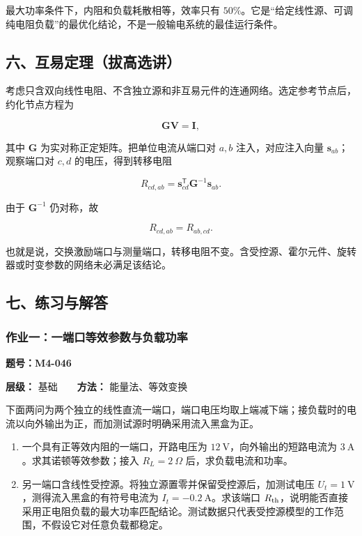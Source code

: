 最大功率条件下，内阻和负载耗散相等，效率只有
\(50\%\)。它是``给定线性源、可调纯电阻负载''的最优化结论，不是一般输电系统的最佳运行条件。

\subsection{六、互易定理（拔高选讲）}\label{m4:ux516dux4e92ux6613ux5b9aux7406ux62d4ux9ad8ux9009ux8bb2}

考虑只含双向线性电阻、不含独立源和非互易元件的连通网络。选定参考节点后，约化节点方程为

\[
\boldsymbol G\boldsymbol V=\boldsymbol I,
\]

其中 \(\boldsymbol G\) 为实对称正定矩阵。把单位电流从端口对 \(a,b\)
注入，对应注入向量 \(\boldsymbol s_{ab}\)；观察端口对 \(c,d\)
的电压，得到转移电阻

\[
R_{cd,ab}
=\boldsymbol s_{cd}^{\mathsf T}
\boldsymbol G^{-1}\boldsymbol s_{ab}.
\]

由于 \(\boldsymbol G^{-1}\) 仍对称，故

\[
\boxed{R_{cd,ab}=R_{ab,cd}}.
\]

也就是说，交换激励端口与测量端口，转移电阻不变。含受控源、霍尔元件、旋转器或时变参数的网络未必满足该结论。

\subsection{七、练习与解答}\label{m4:ux4e03ux7ec3ux4e60ux4e0eux89e3ux7b54-2}

\par{}
\noindent\begin{minipage}{\linewidth}

\subsubsection{作业一：一端口等效参数与负载功率}\label{m4:ux4f5cux4e1aux4e00ux4e00ux7aefux53e3ux7b49ux6548ux53c2ux6570ux4e0eux8d1fux8f7dux529fux7387}

\textbf{题号：M4-046}

\textbf{层级：} 基础　　\textbf{方法：} 能量法、等效变换

下面两问为两个独立的线性直流一端口，端口电压均取上端减下端；接负载时的电流以向外输出为正，而加测试源时明确采用流入黑盒为正。

\begin{enumerate}
\def\labelenumi{(\arabic{enumi})}
\item
  一个具有正等效内阻的一端口，开路电压为
  \(12\ \mathrm V\)，向外输出的短路电流为
  \(3\ \mathrm A\)。求其诺顿等效参数；接入 \(R_L=2\ \Omega\)
  后，求负载电流和功率。
\item
  另一端口含线性受控源。将独立源置零并保留受控源后，加测试电压
  \(U_t=1\ \mathrm V\)，测得流入黑盒的有符号电流为
  \(I_t=-0.2\ \mathrm A\)。求该端口
  \(R_{\rm th}\)，说明能否直接采用正电阻负载的最大功率匹配结论。测试数据只代表受控源模型的工作范围，不假设它对任意负载都稳定。
\end{enumerate}

\end{minipage}\par


